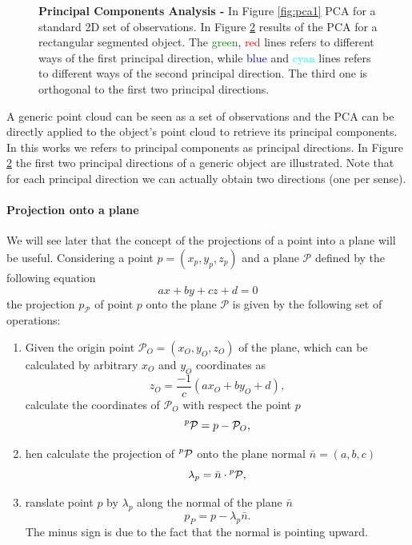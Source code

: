 \begin{figure}[tb]
\begin{subfigure}[t]{0.45\textwidth}
\caption{}\label{fig:pca2}
\end{subfigure}
\caption{\textbf{Principal Components Analysis -} In Figure \ref{fig:pca1} PCA for a standard 2D set of observations. In Figure \ref{fig:pca2} results of the PCA for a rectangular segmented object. The \textcolor{green}{green}, \textcolor{red}{red} lines refers to different ways of the first principal direction, while \textcolor{blue}{blue} and \textcolor{cyan}{cyan} lines refers to different ways of the second principal direction. The third one is orthogonal to the first two principal directions.}
\end{figure}

A generic point cloud can be seen as a set of observations and the PCA can be directly applied to the object's point cloud to retrieve its principal components. In this works we refers to principal components as principal directions. In Figure \ref{fig:pca2} the first two principal directions of a generic object are illustrated. Note that for each principal direction we can actually obtain two directions (one per sense).

\paragraph{Projection onto a plane}
We will see later that the concept of the projections of a point into a plane will be useful. Considering a point $p=(x_p,y_p,z_p)$ and a plane $\mathcal{P}$ defined by the following equation
\begin{equation}
a x + by + cz + d = 0
\end{equation}
the projection $p_{\mathcal{P}}$ of point $p$ onto the plane $\mathcal{P}$ is given by the following set of operations:

\begin{enumerate}
\item Given the origin point $\mathcal{P}_O=(x_O,y_O,z_O)$ of the plane, which can be calculated by arbitrary $x_O$ and $y_O$ coordinates as
\[
z_O = \frac{-1}{c}(ax_O + by_O + d),
\]
calculate the coordinates of $\mathcal{P}_O$ with respect the point $p$
\[
\mathcal{\prescript{p}{}P} = p - \mathcal{P}_O,
\]
\item {}hen calculate the projection of $\mathcal{\prescript{p}{}P}$ onto the plane normal $\bar{n}=(a,b,c)$
\[
\lambda_p = \bar{n} \cdot \mathcal{\prescript{p}{}P}, 
\]
\item {}ranslate point $p$ by $\lambda_p$ along the normal of the plane $\bar{n}$
\[
p_P = p - \lambda_p \bar{n}. 
\]
The minus sign is due to the fact that the normal is pointing upward.
\end{enumerate}

